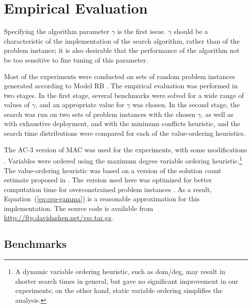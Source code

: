 \section{Empirical Evaluation}
\label{sec:csp-empirical}

Specifying the algorithm parameter $\gamma$ is the first issue.
$\gamma$ should be a characteristic of the
implementation of the search algorithm, rather than of the problem
instance; it is also desirable that the performance of the algorithm not
be too sensitive to fine tuning of this parameter.


Most of the  experiments were conducted on sets of random problem instances
generated according to Model RB \cite{Xu.rb}. The empirical evaluation
was performed in two stages. In the first stage, several benchmarks
were solved for a wide range of values of $\gamma$, and an appropriate
value for $\gamma$ was chosen. In the second stage, the search was run
on two sets of problem instances with the chosen $\gamma$, as well as
with exhaustive deployment, and with the minimum conflicts
heuristic, and the search time distributions were compared for each of
the value-ordering heuristics.

The AC-3 version of MAC was used for the experiments, with some
modifications \cite{Sabin.mac}. Variables were ordered using the
maximum degree variable ordering heuristic.\footnote{A dynamic
  variable ordering heuristic, such as dom/deg, may result in shorter
  search times in general, but gave no significant improvement  in our
  experiments; on the other hand, static variable ordering simplifies
  the analysis.} The value-ordering heuristic was based on a version
of the solution count estimate proposed in \cite{Meisels.solcount}.
The version used here was optimized for better computation time for
overconstrained problem instances . As a result,
Equation~(\ref{eq:csp-gamma}) is a reasonable approximation for this 
implementation. The source code is available from
\url{http://ftp.davidashen.net/vsc.tar.gz}.

\subsection{Benchmarks}

